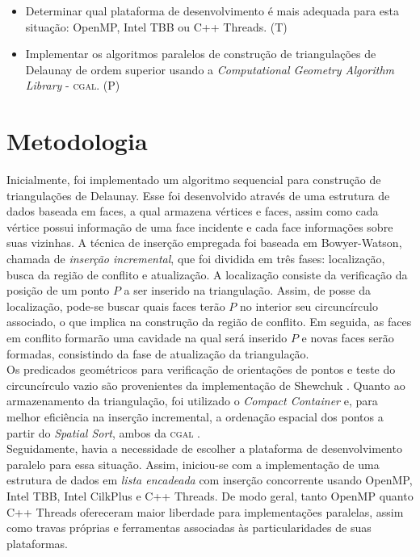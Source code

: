 \documentclass[a4paper, 12pt]{article}
\begin{document}
\begin{itemize}
	\item Determinar qual plataforma de desenvolvimento é mais adequada para esta situação: OpenMP, Intel TBB ou C++ Threads. (T)
	\item Implementar os algoritmos paralelos de construção de triangulações de Delaunay de ordem superior usando a 
		\textit{Computational Geometry Algorithm Library} - \textsc{cgal}. (P)
\end{itemize}

\section*{Metodologia}
Inicialmente, foi implementado um algoritmo sequencial para construção de triangulações de Delaunay. Esse foi desenvolvido através 
de uma estrutura de dados baseada em faces, a qual armazena vértices e faces, assim como cada vértice possui informação de uma 
face incidente e cada face informações sobre suas vizinhas. A técnica de inserção empregada foi baseada em Bowyer-Watson, chamada
de \textit{inserção incremental}, que foi dividida em três fases: localização, busca da região de conflito e atualização. A 
localização consiste da  verificação da posição de um ponto $P$ a ser inserido na triangulação. Assim, de posse da localização, pode-se buscar 
quais faces terão $P$ no interior seu circuncírculo associado, o que implica na construção da região de conflito. Em seguida, as faces 
em conflito formarão uma cavidade na qual será inserido $P$ e novas faces serão formadas, consistindo da fase de atualização da triangulação. \\

Os predicados geométricos para verificação de orientações de pontos
e teste do circuncírculo vazio são provenientes da implementação de Shewchuk \cite{shewchuk}. Quanto ao armazenamento da triangulação, 
foi utilizado o \textit{Compact Container} e, para melhor eficiência na inserção incremental, a ordenação espacial dos pontos a partir
 do \textit{Spatial Sort}, ambos da \textsc{cgal} \cite{cgal}. \\

Seguidamente, havia a necessidade de escolher a plataforma de desenvolvimento paralelo para essa situação. Assim, iniciou-se com 
a implementação de uma estrutura de dados em \textit{lista encadeada} com inserção concorrente usando OpenMP, Intel TBB, 
Intel CilkPlus e C++ Threads. De modo geral, tanto OpenMP quanto C++ Threads ofereceram maior liberdade para implementações
paralelas, assim como travas próprias e ferramentas associadas às particularidades de suas plataformas. \\
\end{document}
